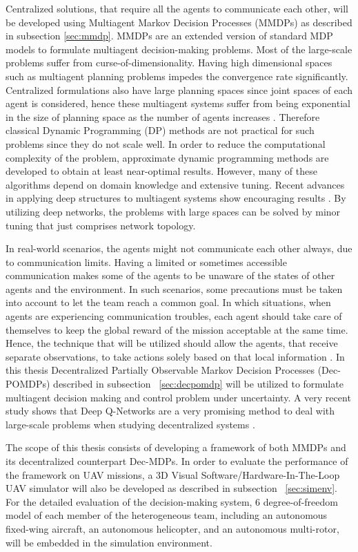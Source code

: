 \documentclass{ituphdreport}
\begin{document}
Centralized solutions, that require all the agents to communicate each other, will be developed using Multiagent Markov Decision Processes (MMDPs) as described in subsection \ref{sec:mmdp}. MMDPs are an extended version of standard MDP models to formulate multiagent decision-making problems. Most of the large-scale problems suffer from curse-of-dimensionality. Having high dimensional spaces such as multiagent planning problems impedes the convergence rate significantly. Centralized formulations also have large planning spaces since joint spaces of each agent is considered, hence these multiagent systems suffer from being exponential in the size of planning space as the number of agents increases \cite{redding2011approximate}. Therefore classical Dynamic Programming (DP) methods are not practical for such problems since they do not scale well. In order to reduce the computational complexity of the problem, approximate dynamic programming methods are developed to obtain at least near-optimal results. However, many of these algorithms depend on domain knowledge and extensive tuning. Recent advances in applying deep structures to multiagent systems show encouraging results \cite{hausknecht2015deep}\cite{tampuu2017multiagent}. By utilizing deep networks, the problems with large spaces can be solved by minor tuning that just comprises network topology. 

In real-world scenarios, the agents might not communicate each other always, due to communication limits. Having a limited or sometimes accessible communication makes some of the agents to be unaware of the states of other agents and the environment. In such scenarios, some precautions must be taken into account to let the team reach a common goal. In which situations, when agents are experiencing communication troubles, each agent should take care of themselves to keep the global reward of the mission acceptable at the same time. Hence, the technique that will be utilized should allow the agents, that receive separate observations, to take actions solely based on that local information \cite{amato13}. In this thesis Decentralized Partially Observable Markov Decision Processes (Dec-POMDPs) described in subsection ~\ref{sec:decpomdp} will be utilized to formulate multiagent decision making and control problem under uncertainty. A very recent study shows that Deep Q-Networks are a very promising method to deal with large-scale problems when studying decentralized systems \cite{chen2016decentralized}.

The scope of this thesis consists of developing a framework of both MMDPs and its decentralized counterpart Dec-MDPs. In order to evaluate the performance of the framework on UAV missions, a 3D Visual Software/Hardware-In-The-Loop UAV simulator will also be developed as described in subsection ~\ref{sec:simenv}. For the detailed evaluation of the decision-making system, 6 degree-of-freedom model of each member of the heterogeneous team, including an autonomous fixed-wing aircraft, an autonomous helicopter, and an autonomous multi-rotor, will be embedded in the simulation environment.
\end{document}
